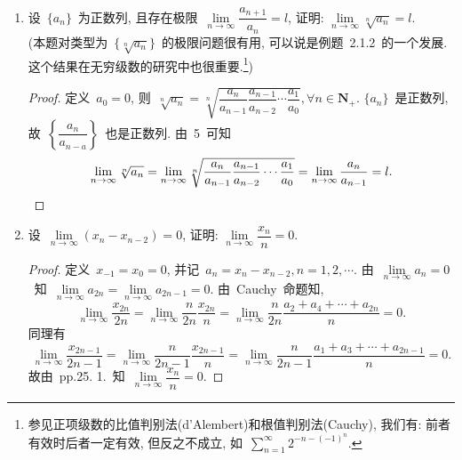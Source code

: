 \documentclass[UTF8,a4paper,10pt,twoside]{book}
\begin{document}
\begin{enumerate}
\begin{proof}
		      若~$A>0$, 则~$\lim\limits_{n\to\infty} \dfrac{1}{a_n}=\dfrac{1}{A}$, 由~Cauchy~命题知
		      \[
			      \lim\limits_{n\to\infty} \dfrac{n}{\frac{1}{a_1}+\frac{1}{a_2}+\cdots+\frac{1}{a_n}}=\lim\limits_{n\to\infty} \dfrac{1}{\dfrac{\frac{1}{a_1}+\frac{1}{a_2}+\cdots+\frac{1}{a_n}}{n}}=\dfrac{1}{\frac{1}{A}}=A,
		      \]
		      \[
			      \lim\limits_{n\to\infty} \dfrac{a_1+a_2+\cdots+a_n}{n}=A.
		      \]
		      故由夹逼定理知, $\lim\limits_{n\to\infty} (a_1a_2\cdots a_n)^\frac{1}{n}=A$.\qedhere
	      \end{proof}
	\item 设~$\{a_n\}$~为正数列, 且存在极限~$\lim\limits_{n\to\infty} \dfrac{a_{n+1}}{a_n}=l$, 证明: $\lim\limits_{n\to\infty} \sqrt[n]{a_n}=l$.\\
	      (本题对类型为~$\{\sqrt[n]{a_n}\}$~的极限问题很有用, 可以说是例题~2.1.2~的一个发展. 这个结果在无穷级数的研究中也很重要.\footnote{参见正项级数的比值判别法(d'Alembert)和根值判别法(Cauchy), 我们有: 前者有效时后者一定有效, 但反之不成立, 如~$\sum_{n=1}^{\infty} 2^{-n-(-1)^n}$.})
	      \begin{proof}
		      定义~$a_0=0$, 则~$\sqrt[n]{a_n}=\sqrt[n]{\dfrac{a_n}{a_{n-1}}\dfrac{a_{n-1}}{a_{n-2}}\cdots\dfrac{a_1}{a_0}}, \forall n\in\mathbf{N}_{+}$. $\{a_n\}$~是正数列, 故~$\left\{\dfrac{a_n}{a_{n-a}}\right\}$~也是正数列. 由~5~可知
		      \[
			      \lim\limits_{n\to\infty} \sqrt[n]{a_n}=\lim\limits_{n\to\infty} \sqrt[n]{\dfrac{a_n}{a_{n-1}}\dfrac{a_{n-1}}{a_{n-2}}\cdots\dfrac{a_1}{a_0}}=\lim\limits_{n\to\infty} \dfrac{a_n}{a_{n-1}}=l.\qedhere
		      \]
	      \end{proof}
	\item 设~$\lim\limits_{n\to\infty} (x_n-x_{n-2})=0$, 证明: $\lim\limits_{n\to\infty} \dfrac{x_n}{n}=0$.
	      \begin{proof}
		      定义~$x_{-1}=x_0=0$, 并记~$a_n=x_n-x_{n-2}, n=1,2,\cdots$. 由~$\lim\limits_{n\to\infty} a_n=0$~知~$\lim\limits_{n\to\infty} a_{2n}=\lim\limits_{n\to\infty} a_{2n-1}=0$. 由~Cauchy~命题知,
		      \[
			      \lim\limits_{n\to\infty} \dfrac{x_{2n}}{2n}=\lim\limits_{n\to\infty} \dfrac{n}{2n}\dfrac{x_{2n}}{n}=\lim\limits_{n\to\infty} \dfrac{n}{2n}\dfrac{a_2+a_4+\cdots+a_{2n}}{n}=0.
		      \]
		      同理有
		      \[
			      \lim\limits_{n\to\infty} \dfrac{x_{2n-1}}{2n-1}=\lim\limits_{n\to\infty} \dfrac{n}{2n-1}\dfrac{x_{2n-1}}{n}=\lim\limits_{n\to\infty} \dfrac{n}{2n-1}\dfrac{a_1+a_3+\cdots+a_{2n-1}}{n}=0.
		      \]
		      故由~pp.25. 1.~知~$\lim\limits_{n\to\infty} \dfrac{x_n}{n}=0$.\qedhere
	      \end{proof}

\end{enumerate}
\end{document}
